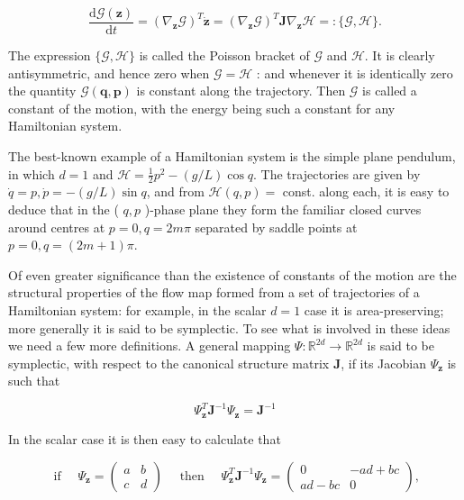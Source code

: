 \documentclass[10pt]{article}
\begin{document}
\[
\frac{\mathrm{d} \mathcal{G}(\mathbf{z})}{\mathrm{d} t}=\left(\nabla_{\mathbf{z}} \mathcal{G}\right)^{T} \dot{\mathbf{z}}=\left(\nabla_{\mathbf{z}} \mathcal{G}\right)^{T} \mathbf{J} \nabla_{\mathbf{z}} \mathcal{H}=:\{\mathcal{G}, \mathcal{H}\} .
\]

The expression \(\{\mathcal{G}, \mathcal{H}\}\) is called the Poisson bracket of \(\mathcal{G}\) and \(\mathcal{H}\). It is clearly antisymmetric, and hence zero when \(\mathcal{G}=\mathcal{H}\) : and whenever it is identically zero the quantity \(\mathcal{G}(\mathbf{q}, \mathbf{p})\) is constant along the trajectory. Then \(\mathcal{G}\) is called a constant of the motion, with the energy being such a constant for any Hamiltonian system.

The best-known example of a Hamiltonian system is the simple plane pendulum, in which \(d=1\) and \(\mathcal{H}=\frac{1}{2} p^{2}-(g / L) \cos q\). The trajectories are given by \(\dot{q}=p, \dot{p}=-(g / L) \sin q\), and from \(\mathcal{H}(q, p)=\) const. along each, it is easy to deduce that in the ( \(q, p\) )-phase plane they form the familiar closed curves around centres at \(p=0, q=2 m \pi\) separated by saddle points at \(p=0, q=(2 m+1) \pi\).

Of even greater significance than the existence of constants of the motion are the structural properties of the flow map formed from a set of trajectories of a Hamiltonian system: for example, in the scalar \(d=1\) case it is area-preserving; more generally it is said to be symplectic. To see what is involved in these ideas we need a few more definitions. A general mapping \(\Psi: \mathbb{R}^{2 d} \rightarrow \mathbb{R}^{2 d}\) is said to be symplectic, with respect to the canonical structure matrix \(\mathbf{J}\), if its Jacobian \(\Psi_{\mathbf{z}}\) is such that

\[
\Psi_{\mathbf{z}}^{T} \mathbf{J}^{-1} \Psi_{\mathbf{z}}=\mathbf{J}^{-1}
\]

In the scalar case it is then easy to calculate that

\[
\text { if } \quad \Psi_{\mathbf{z}}=\left(\begin{array}{ll}
a & b \\
c & d
\end{array}\right) \quad \text { then } \quad \Psi_{\mathbf{z}}^{T} \mathbf{J}^{-1} \Psi_{\mathbf{z}}=\left(\begin{array}{cc}
0 & -a d+b c \\
a d-b c & 0
\end{array}\right),
\]
\end{document}
